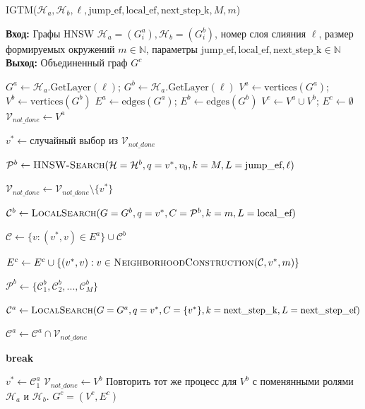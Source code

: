 \documentclass{article}
\begin{document}
\begin{algorithm}
\caption{\textsc{IGTM}($\mathcal{H}_a, \mathcal{H}_b, \ell, \text{jump\_ef}, \text{local\_ef}, \text{next\_step\_k}, M, m$)}\label{alg:IGTM}
\textbf{Вход:} Графы HNSW $\mathcal{H}_a = (G^a_i), \mathcal{H}_b = (G^b_i)$, номер слоя слияния $\ell$, размер формируемых окружений $m \in \mathbb{N}$, параметры $\text{jump\_ef}, \text{local\_ef}, \text{next\_step\_k} \in \mathbb{N}$ \\
\textbf{Выход:} Объединенный граф $G^c$ 
\begin{algorithmic}[1]
\State $G^a \gets \mathcal{H}_a\text{.GetLayer}(\ell) $; $G^b \gets\mathcal{H}_a\text{.GetLayer}(\ell)$ 
\State $V^a \gets \text{vertices}(G^a)$; $V^b \gets \text{vertices}(G^b)$
\State $E^a \gets \text{edges}(G^a)$; $E^b \gets \text{edges}(G^b)$
\State $V^c \gets V^a \cup V^b$; $E^c \gets \emptyset$ 
\State $\mathcal{V}_{not\_done} \gets V^a$

    \State $v^* \gets \text{случайный выбор из } \mathcal{V}_{not\_done}$
    
    \State $\mathcal{P}^b  \gets \textsc{HNSW-Search}(\mathcal{H}=\mathcal{H}^b, q=v^*, v_0, k=M, L=\text{jump\_ef}, \ell)$
    
        \State $\mathcal{V}_{not\_done} \gets \mathcal{V}_{not\_done} \setminus \{v^*\}$
        
        \State $\mathcal{C}^b  \gets \textsc{LocalSearch}(G=G^b, q=v^*, C=\mathcal{P}^b , k=m, L=\text{local\_ef})$
        
        \State $\mathcal{C} \gets  \{v : (v^*, v) \in E^a \} \cup \mathcal{C}^b$
        
        \State $E^c \gets E^c \cup  \{ (v^*, v)  : v \in \textsc{NeighborhoodConstruction}(\mathcal{C}, v^*, m) \}$

        \State $\mathcal{P}^b \gets \{\mathcal{C}^b_1, \mathcal{C}^b_2, ..., \mathcal{C}^b_M \} $

        \State $\mathcal{C}^a  \gets \textsc{LocalSearch}(G=G^a, q=v^*, C=\{v^*\} , k=\text{next\_step\_k}, L=\text{next\_step\_ef})$
        
        \State $\mathcal{C}^a \gets \mathcal{C}^a \cap \mathcal{V}_{not\_done}$
        
            \State \textbf{break}
        \EndIf
        
        \State $v^* \gets \mathcal{C}^a_1$
    \EndWhile
\EndWhile
\State $\mathcal{V}_{not\_done} \gets V^b$
    \State Повторить тот же процесс для $V^b$ с поменянными ролями $\mathcal{H}_a$ и $\mathcal{H}_b$.
\EndWhile
\State \Return $G^c=(V^c,E^c)$
\end{algorithmic}
\end{algorithm}
\end{document}

